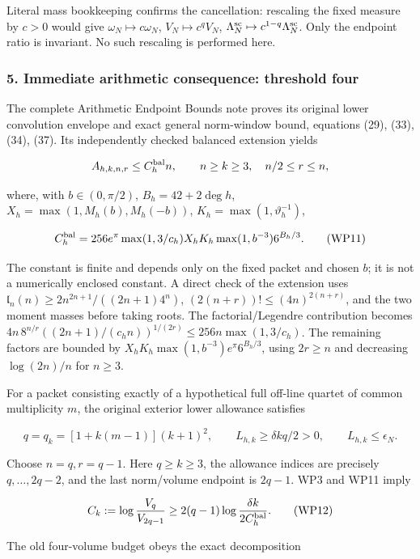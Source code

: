 Literal mass bookkeeping confirms the cancellation: rescaling the fixed measure by \(c>0\) would give \(\omega_N\mapsto c\omega_N\), \(V_N\mapsto c^qV_N\), \(\Lambda_N^{\rm sc}\mapsto c^{1-q}\Lambda_N^{\rm sc}\). Only the endpoint ratio is invariant. No such rescaling is performed here.

\subsubsection{5. Immediate arithmetic consequence: threshold four}\label{endpoint-window_product_owner--immediate-arithmetic-consequence-threshold-four}

The complete Arithmetic Endpoint Bounds note proves its original lower convolution envelope and exact general norm-window bound, equations (29), (33), (34), (37). Its independently checked balanced extension yields

\[
A_{h,k,n,r}\le C_h^{\rm bal}n,\qquad n\ge k\ge3,\quad n/2\le r\le n,
\]

where, with \(b\in(0,\pi/2)\), \(B_h=42+2\deg h\), \(X_h=\max(1,M_h(b),M_h(-b))\), \(K_h=\max(1,\vartheta_h^{-1})\),

\[
C_h^{\rm bal}=256e^\pi\max(1,3/c_h)X_hK_h\max(1,b^{-3})6^{B_h/3}.
\tag{WP11}
\]

The constant is finite and depends only on the fixed packet and chosen \(b\); it is not a numerically enclosed constant. A direct check of the extension uses \(\mathfrak l_n(n)\ge2n^{2n+1}/((2n+1)4^n)\), \((2(n+r))!\le(4n)^{2(n+r)}\), and the two moment masses before taking roots. The factorial/Legendre contribution becomes \(4n\,8^{n/r}((2n+1)/(c_hn))^{1/(2r)}\le256n\max(1,3/c_h)\). The remaining factors are bounded by \(X_hK_h\max(1,b^{-3})e^\pi6^{B_h/3}\), using \(2r\ge n\) and decreasing \(\log(2n)/n\) for \(n\ge3\).

For a packet consisting exactly of a hypothetical full off-line quartet of common multiplicity \(m\), the original exterior lower allowance satisfies

\[
q=q_k=[1+k(m-1)](k+1)^2,\qquad L_{h,k}\ge\delta kq/2>0,
\qquad L_{h,k}\le\epsilon_N.
\]

Choose \(n=q,r=q-1\). Here \(q\ge k\ge3\), the allowance indices are precisely \(q,\ldots,2q-2\), and the last norm/volume endpoint is \(2q-1\). WP3 and WP11 imply

\[
C_k:=\log\frac{V_q}{V_{2q-1}}
\ge2(q-1)\log\frac{\delta k}{2C_h^{\rm bal}}. \tag{WP12}
\]

The old four-volume budget obeys the exact decomposition

